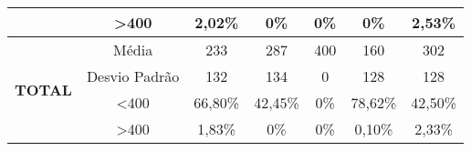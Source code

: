 \begin{table}[]
\begin{tabular}{|c|c|ccccc|}
                                & \textgreater 400 & 2,02\%            & 0\%            & 0\%            & 0\%            & 2,53\%            \\ \hline
\multirow{4}{*}{\textbf{TOTAL}} & Média            & 233               & 287               & 400               & 160               & 302               \\
                                & Desvio Padrão    & 132               & 134               & 0                 & 128               & 128               \\
                                & \textless 400    & 66,80\%           & 42,45\%           & 0\%            & 78,62\%           & 42,50\%           \\
                                & \textgreater 400 & 1,83\%            & 0\%            & 0\%            & 0,10\%            & 2,33\%            \\ \hline
\end{tabular}
\end{table}
